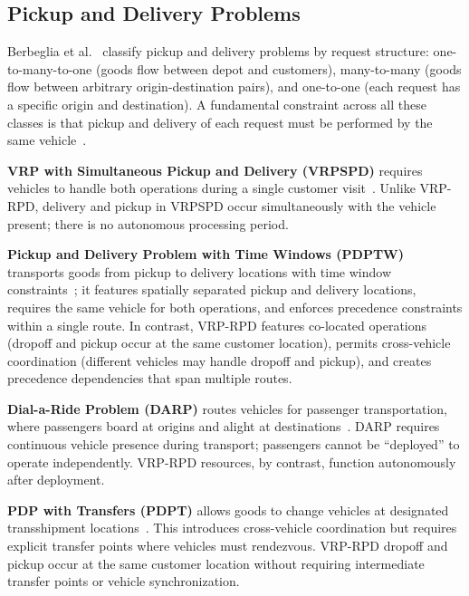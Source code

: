 \documentclass{article}
\begin{document}
\subsection{Pickup and Delivery Problems}

Berbeglia et al.~\cite{berbeglia2007static} classify pickup and delivery problems by request structure: one-to-many-to-one (goods flow between depot and customers), many-to-many (goods flow between arbitrary origin-destination pairs), and one-to-one (each request has a specific origin and destination). A fundamental constraint across all these classes is that pickup and delivery of each request must be performed by the same vehicle~\cite{parragh2008survey2}.

\textbf{VRP with Simultaneous Pickup and Delivery (VRPSPD)} requires vehicles to handle both operations during a single customer visit~\cite{dethloff2001vehicle, koc2020review}. Unlike VRP-RPD, delivery and pickup in VRPSPD occur simultaneously with the vehicle present; there is no autonomous processing period. 

\textbf{Pickup and Delivery Problem with Time Windows (PDPTW)} transports goods from pickup to delivery locations with time window constraints~\cite{dumas1991pickup, ropke2006adaptive}; it features spatially separated pickup and delivery locations, requires the same vehicle for both operations, and enforces precedence constraints within a single route. In contrast, VRP-RPD features co-located operations (dropoff and pickup occur at the same customer location), permits cross-vehicle coordination (different vehicles may handle dropoff and pickup), and creates precedence dependencies that span multiple routes.

\textbf{Dial-a-Ride Problem (DARP)} routes vehicles for passenger transportation, where passengers board at origins and alight at destinations~\cite{cordeau2007darp, parragh2010variable}. DARP requires continuous vehicle presence during transport; passengers cannot be ``deployed'' to operate independently. VRP-RPD resources, by contrast, function autonomously after deployment. 

\textbf{PDP with Transfers (PDPT)} allows goods to change vehicles at designated transshipment locations~\cite{masson2013pdpt}. This introduces cross-vehicle coordination but requires explicit transfer points where vehicles must rendezvous. VRP-RPD dropoff and pickup occur at the same customer location without requiring intermediate transfer points or vehicle synchronization.
\end{document}
